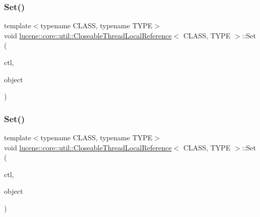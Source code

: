 \subsubsection{\texorpdfstring{Set()}{Set()}\hspace{0.1cm}{\footnotesize\ttfamily [1/2]}}
{\footnotesize\ttfamily template$<$typename C\+L\+A\+SS, typename T\+Y\+PE$>$ \\
void \mbox{\hyperlink{classlucene_1_1core_1_1util_1_1CloseableThreadLocalReference}{lucene\+::core\+::util\+::\+Closeable\+Thread\+Local\+Reference}}$<$ C\+L\+A\+SS, T\+Y\+PE $>$\+::Set (\begin{DoxyParamCaption}\item[{\mbox{\hyperlink{classlucene_1_1core_1_1util_1_1CloseableThreadLocal}{Closeable\+Thread\+Local}}$<$ C\+L\+A\+SS, T\+Y\+PE $>$ $\ast$}]{ctl,  }\item[{\mbox{\hyperlink{ZlibCrc32_8h_a2c212835823e3c54a8ab6d95c652660e}{const}} T\+Y\+PE \&}]{object }\end{DoxyParamCaption})\hspace{0.3cm}{\ttfamily [inline]}}

\mbox{\label{classlucene_1_1core_1_1util_1_1CloseableThreadLocalReference_a2a565539a30bc0a9cac563262989775f}} 
\subsubsection{\texorpdfstring{Set()}{Set()}\hspace{0.1cm}{\footnotesize\ttfamily [2/2]}}
{\footnotesize\ttfamily template$<$typename C\+L\+A\+SS, typename T\+Y\+PE$>$ \\
void \mbox{\hyperlink{classlucene_1_1core_1_1util_1_1CloseableThreadLocalReference}{lucene\+::core\+::util\+::\+Closeable\+Thread\+Local\+Reference}}$<$ C\+L\+A\+SS, T\+Y\+PE $>$\+::Set (\begin{DoxyParamCaption}\item[{\mbox{\hyperlink{classlucene_1_1core_1_1util_1_1CloseableThreadLocal}{Closeable\+Thread\+Local}}$<$ C\+L\+A\+SS, T\+Y\+PE $>$ $\ast$}]{ctl,  }\item[{T\+Y\+PE \&\&}]{object }\end{DoxyParamCaption})\hspace{0.3cm}{\ttfamily [inline]}}



